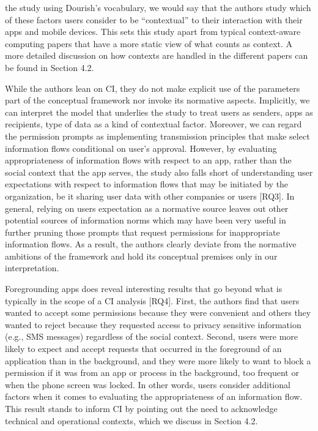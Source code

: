 \documentclass[../thesis.tex]{subfiles}
\begin{document}
the study using Dourish's vocabulary, we would say that
the authors study which of these factors users consider to be
``contextual'' to their interaction
with their apps and mobile devices. This sets this study apart from
typical context-aware computing papers that have a more static view of
what counts as context. A more detailed discussion on how contexts are
handled in the different papers can be found in Section
4.2.

While the authors lean on CI, they do not make explicit use of the
parameters part of the conceptual framework nor invoke its normative
aspects. Implicitly, we can interpret the model that underlies the
study to treat users as senders, apps as recipients, type of data as a
kind of contextual factor. Moreover, we can regard the permission
prompts as implementing transmission principles that make select
information flows conditional on user's approval.
However, by evaluating appropriateness of information flows with
respect to an app, rather than the social context that the app serves,
the study also falls short of understanding user expectations with
respect to information flows that may be initiated by the organization,
be it sharing user data with other companies or users [RQ3]. In
general, relying on users expectation as a normative source leaves out
other potential sources of information norms which may have been very
useful in further pruning those prompts that request permissions for
inappropriate information flows. As a result, the authors clearly
deviate from the normative ambitions of the framework and hold its
conceptual premises only in our interpretation.

Foregrounding apps does reveal interesting
results that go beyond what is typically in the scope of a CI analysis
[RQ4]. First, the authors find that users wanted to accept some
permissions because they were convenient and others they wanted to
reject because they requested access to privacy sensitive information
(e.g., SMS messages) regardless of the social context. Second, users
were more likely to expect and accept requests that occurred in the
foreground of an application than in the background, and they were more
likely to want to block a permission if it was from an app or process
in the background, too frequent or when the phone screen was locked. In
other words, users consider additional factors when it comes to
evaluating the appropriateness of an information flow. This result
stands to inform CI by pointing out the need to acknowledge technical
and operational contexts, which we discuss in Section 4.2.
\end{document}
